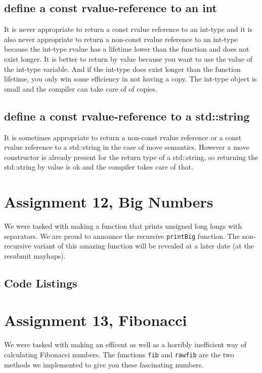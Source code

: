 \documentclass[a4paper]{article}
\begin{document}
\subsection*{define a const rvalue-reference to an int}
It is never appropriate to return a const rvalue reference  to an int-type and it is also never appropriate to return a non-const rvalue reference to an int-type because the int-type rvalue has a lifetime lower than the function and does not exist longer. It is better to return by value because you want to use the value of the int-type variable. And if the int-type does exist longer than the function lifetime, you only win some efficiency in not having a copy. The int-type object is small and the compiler can take care of of copies.
\subsection*{define a const rvalue-reference to a std::string}
It is sometimes appropriate to return a non-const rvalue reference or a const rvalue reference to a std::string in the case of move semantics. However a move constructor is already present for the return type of a std::string, so returning the std::string by value is ok and the compiler takes care of that.

\section*{Assignment 12, Big Numbers}
We were tasked with making a function that prints unsigned long longs with separators.
We are proud to announce the recursive \texttt{printBig} function.
The non-recursive variant of this amazing function will be revealed at a later date (at the resubmit mayhaps).

\subsection*{Code Listings}




\section*{Assignment 13, Fibonacci}
We were tasked with making an efficent as well as a horribly inefficient way of calculating Fibonacci numbers.
The functions \texttt{fib} and \texttt{rawfib} are the two methods we implemented to give you these fascinating numbers.
\end{document}
